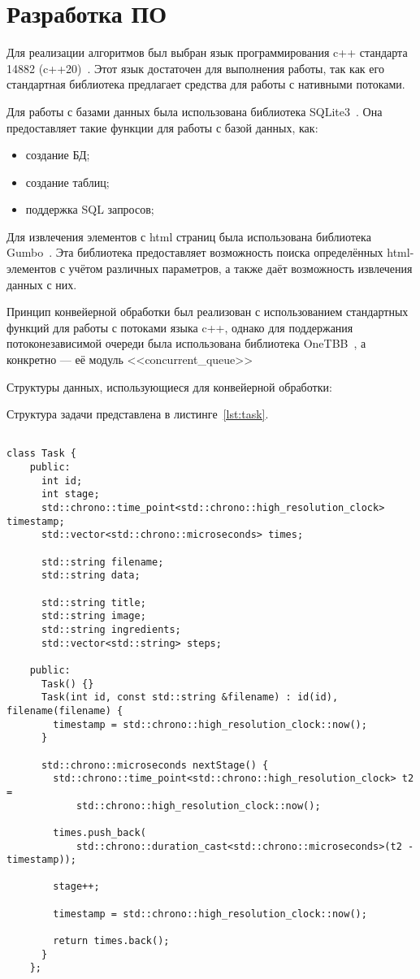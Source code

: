 \chapter{Разработка ПО}

Для реализации алгоритмов был выбран язык программирования c++ стандарта 14882 (c++20)~\cite{cpp}. Этот язык достаточен для выполнения работы, так как его стандартная библиотека предлагает средства для работы с нативными потоками.

Для работы с базами данных была использована библиотека SQLite3~\cite{sqlite}. Она предоставляет такие функции для работы с базой данных, как:
\begin{itemize}
    \item создание БД;
    \item создание таблиц;
    \item поддержка SQL запросов;
\end{itemize}

Для извлечения элементов с html страниц была использована библиотека Gumbo~\cite{gumbo}. Эта библиотека предоставляет возможность поиска определённых html-элементов с учётом различных параметров, а также даёт возможность извлечения данных с них.

Принцип конвейерной обработки был реализован с использованием стандартных функций для работы с потоками языка c++, однако для поддержания потоконезависимой очереди была использована библиотека OneTBB~\cite{onetbb}, а конкретно --- её модуль <<concurrent\_queue>>

Структуры данных, использующиеся для конвейерной обработки:

Структура задачи представлена в листинге~\ref{lst:task}.

\begin{lstlisting}[caption={Структура задачи},label={lst:task}]
    
class Task {
    public:
      int id;
      int stage;
      std::chrono::time_point<std::chrono::high_resolution_clock> timestamp;
      std::vector<std::chrono::microseconds> times;
    
      std::string filename;
      std::string data;
    
      std::string title;
      std::string image;
      std::string ingredients;
      std::vector<std::string> steps;
    
    public:
      Task() {}
      Task(int id, const std::string &filename) : id(id), filename(filename) {
        timestamp = std::chrono::high_resolution_clock::now();
      }
    
      std::chrono::microseconds nextStage() {
        std::chrono::time_point<std::chrono::high_resolution_clock> t2 =
            std::chrono::high_resolution_clock::now();
    
        times.push_back(
            std::chrono::duration_cast<std::chrono::microseconds>(t2 - timestamp));
    
        stage++;
    
        timestamp = std::chrono::high_resolution_clock::now();
    
        return times.back();
      }
    };    
\end{lstlisting}

